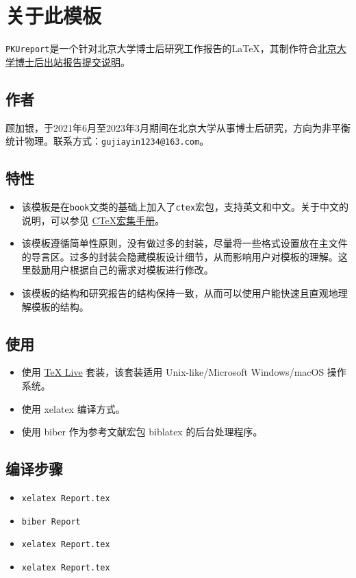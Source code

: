 \chapter{关于此模板}




\texttt{PKUreport}是一个针对北京大学博士后研究工作报告的{\LaTeX}，其制作符合\href{https://www.lib.pku.edu.cn/portal/cn/zy/dzzy/chuzhanbaogao/tijiaoyaoqiu}{北京大学博士后出站报告提交说明}。



\section*{作者}
顾加银，于2021年6月至2023年3月期间在北京大学从事博士后研究，方向为非平衡统计物理。联系方式：\texttt{gujiayin1234@163.com}。


\section*{特性}
\begin{itemize}
\item 该模板是在\texttt{book}文类的基础上加入了\texttt{ctex}宏包，支持英文和中文。关于中文的说明，可以参见 \href{https://ctan.org/pkg/ctex?lang=en}{CTeX宏集手册}。
\item 该模板遵循简单性原则，没有做过多的封装，尽量将一些格式设置放在主文件的导言区。过多的封装会隐藏模板设计细节，从而影响用户对模板的理解。这里鼓励用户根据自己的需求对模板进行修改。
\item 该模板的结构和研究报告的结构保持一致，从而可以使用户能快速且直观地理解模板的结构。
\end{itemize}



\section*{使用}
\begin{itemize}
\item 使用 \href{http://tug.org/texlive/}{TeX Live} 套装，该套装适用 Unix-like/Microsoft Windows/macOS 操作系统。
\item 使用 xelatex 编译方式。
\item 使用 biber 作为参考文献宏包 biblatex 的后台处理程序。
\end{itemize}




\section*{编译步骤}
\begin{itemize}
\item \texttt{xelatex Report.tex}
\item \texttt{biber Report}
\item \texttt{xelatex Report.tex}
\item \texttt{xelatex Report.tex}
\end{itemize}




